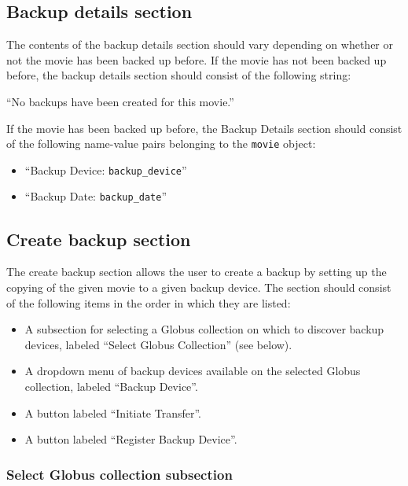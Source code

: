 \subsection{Backup details section}

The contents of the backup details section should vary depending on 
whether or not the movie has been backed up before. If the movie has not been 
backed up before, the backup details section should consist of the following
string: 

\vspace{3mm}
``No backups have been created for this movie.''
\vspace{3mm}

\noindent If the movie has been backed up before, the Backup Details section
should consist of the following name-value pairs belonging to the \texttt{movie} object:

\begin{itemize}\itemsep1pt
  \item ``Backup Device: \texttt{backup\_device}''
  \item ``Backup Date: \texttt{backup\_date}'' 
\end{itemize}

\subsection{Create backup section}

The create backup section allows the user to create a backup by setting up the
copying of the given movie to a given backup device. The section should consist 
of the following items in the order in which they are listed:

\begin{itemize}\itemsep1pt
  \item A subsection for selecting a Globus collection on which to discover backup
  devices, labeled ``Select Globus Collection'' (see below).
  \item A dropdown menu of backup devices available on the selected Globus 
  collection, labeled ``Backup Device''.
  \item A button labeled ``Initiate Transfer''.
  \item A button labeled ``Register Backup Device''.
\end{itemize}

\subsubsection{Select Globus collection subsection}

